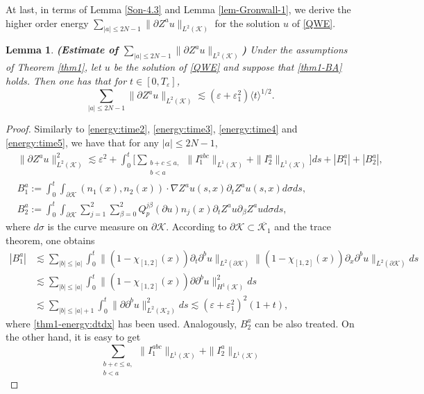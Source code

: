 \documentclass[11pt,twoside]{article}
\def\cK{\mathcal K}
\def\ds{\displaystyle}
\def\p{\partial}
\def\ve{\varepsilon}
\def\ls{\lesssim}
\newcommand{\w}[1]{\langle {#1} \rangle}
\theoremstyle{plain}
\newtheorem{lemma}[theorem]{Lemma}
\theoremstyle{definition}
\numberwithin{equation}{section}
\begin{document}
At last, in terms of Lemma \ref{Son-4.3} and Lemma \ref{lem-Gronwall-1},
we derive the higher order energy $\ds\sum_{|a|\le2N-1}\|\p Z^au\|_{L^2(\cK)}$
for the solution $u$ of \eqref{QWE}.
\begin{lemma}\label{Son-4.4}
{\bf (Estimate of $\ds\sum_{|a|\le2N-1}\|\p Z^au\|_{L^2(\cK)}$)}
Under the assumptions of Theorem \ref{thm1}, let $u$ be the solution of \eqref{QWE} and suppose that \eqref{thm1-BA} holds.
Then one has that for $t\in[0,T_\ve]$,
\begin{equation}\label{thm1-energyA}
\sum_{|a|\le2N-1}\|\p Z^au\|_{L^2(\cK)}\ls(\ve+\ve_1^2)\w{t}^{1/2}.
\end{equation}
\end{lemma}
\begin{proof}
Similarly to \eqref{energy:time2}, \eqref{energy:time3}, \eqref{energy:time4} and \eqref{energy:time5}, we have that
for any $|a|\le2N-1$,
\begin{equation}\label{thm1-energyA1}
\begin{split}
&\|\p Z^au\|^2_{L^2(\cK)}\ls\ve^2+
\int_0^t\Big[\sum_{\substack{b+c\le a,\\b<a}}\|I_1^{abc}\|_{L^1(\cK)}+\|I_2^a\|_{L^1(\cK)}\Big]ds+|B^a_1|+|B^a_2|,\\
&B^a_1:=\int_0^t\int_{\p\cK}(n_1(x),n_2(x))\cdot\nabla Z^au(s,x)\p_tZ^au(s,x)d\sigma ds,\\
&B^a_2:=\int_0^t\int_{\p\cK}\sum_{j=1}^2\sum_{\beta=0}^2Q_p^{j\beta}(\p u)n_j(x)\p_tZ^au\p_{\beta}Z^aud\sigma ds,
\end{split}
\end{equation}
where $d\sigma$ is the curve measure on $\p\cK$.
According to $\p\cK\subset\overline{\cK_1}$ and the trace theorem, one obtains
\begin{equation}\label{thm1-energyA2}
\begin{split}
|B^a_1|&\ls\sum_{|b|\le|a|}\int_0^t\|(1-\chi_{[1,2]}(x))\p_t\p^bu\|_{L^2(\p\cK)}\|(1-\chi_{[1,2]}(x))\p_x\p^bu\|_{L^2(\p\cK)}ds\\
&\ls\sum_{|b|\le|a|}\int_0^t\|(1-\chi_{[1,2]}(x))\p \p^bu\|^2_{H^1(\cK)}ds\\
&\ls\sum_{|b|\le|a|+1}\int_0^t\|\p \p^bu\|^2_{L^2(\cK_2)}ds\ls(\ve+\ve_1^2)^2(1+t),
\end{split}
\end{equation}
where \eqref{thm1-energy:dtdx} has been used. Analogously, $B^a_2$ can be also treated.
On the other hand, it is easy to get
\begin{equation}\label{thm1-energyA3}
\sum_{\substack{b+c\le a,\\b<a}}\|I_1^{abc}\|_{L^1(\cK)}+\|I_2^a\|_{L^1(\cK)}

\end{equation}
\end{proof}
\end{document}
